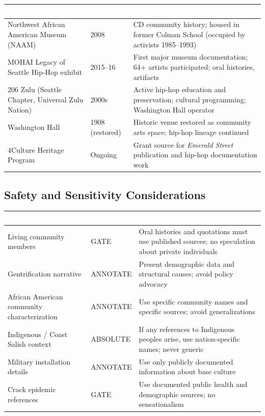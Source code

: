 \documentclass[11pt,letterpaper]{article}
\newcommand{\tableheader}[1]{\textbf{\sffamily\textcolor{white}{#1}}}
\begin{document}
\begin{center}
\begin{tabularx}{\textwidth}{L{4cm}L{2cm}X}
\toprule
{}
\tableheader{Institution} & \tableheader{Est.} & \tableheader{Preservation Function} \\
\midrule
Northwest African American Museum (NAAM) & 2008 & CD community history; housed in former Colman School (occupied by activists 1985--1993) \\
MOHAI Legacy of Seattle Hip-Hop exhibit & 2015--16 & First major museum documentation; 64+ artists participated; oral histories, artifacts \\
206 Zulu (Seattle Chapter, Universal Zulu Nation) & 2000s & Active hip-hop education and preservation; cultural programming; Washington Hall operator \\
Washington Hall & 1908 (restored) & Historic venue restored as community arts space; hip-hop lineage continued \\
4Culture Heritage Program & Ongoing & Grant source for \textit{Emerald Street} publication and hip-hop documentation work \\
\bottomrule
\end{tabularx}
\end{center}

\subsection{Safety and Sensitivity Considerations}

\begin{center}
\begin{tabularx}{\textwidth}{L{3cm}L{2cm}X}
\toprule
{}
\tableheader{Consideration} & \tableheader{Type} & \tableheader{Protocol} \\
\midrule
Living community members & GATE & Oral histories and quotations must use published sources; no speculation about private individuals \\
Gentrification narrative & ANNOTATE & Present demographic data and structural causes; avoid policy advocacy \\
African American community characterization & ANNOTATE & Use specific community names and specific sources; avoid generalizations \\
Indigenous / Coast Salish context & ABSOLUTE & If any references to Indigenous peoples arise, use nation-specific names; never generic \\
Military installation details & ANNOTATE & Use only publicly documented information about base culture \\
Crack epidemic references & GATE & Use documented public health and demographic sources; no sensationalism \\
\bottomrule
\end{tabularx}
\end{center}
\end{document}
